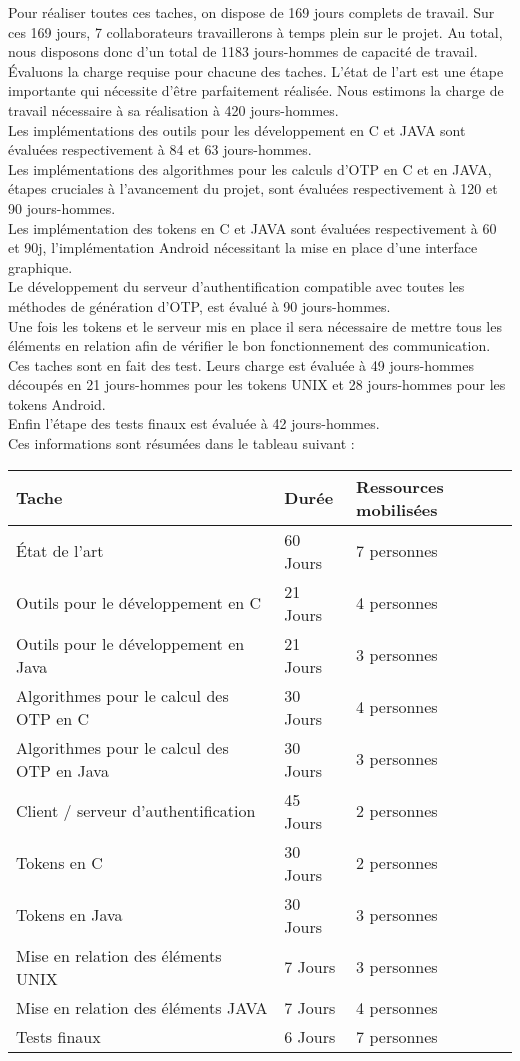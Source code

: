 \documentclass{../../res/univ-projet}
\begin{document}
	Pour réaliser toutes ces taches, on dispose de 169 jours complets de travail. Sur ces 169 jours, 7 collaborateurs travaillerons à temps plein sur le projet.
	Au total, nous disposons donc d'un total de 1183 jours-hommes de capacité de travail.
	Évaluons la charge requise pour chacune des taches.
	L'état de l'art est une étape importante qui nécessite d'être parfaitement réalisée. Nous estimons la charge de travail nécessaire à sa réalisation à 420 jours-hommes. \\
	Les implémentations des outils pour les développement en C et JAVA sont évaluées respectivement à 84 et 63 jours-hommes. \\
	Les implémentations des algorithmes pour les calculs d'OTP en C et en JAVA, étapes cruciales à l'avancement du projet, sont évaluées respectivement à 120 et 90 jours-hommes. \\
	Les implémentation des tokens en C et JAVA sont évaluées respectivement à 60 et 90j, l'implémentation Android nécessitant la mise en place d'une interface graphique. \\
	Le développement du serveur d'authentification compatible avec toutes les méthodes de génération d'OTP, est évalué à 90 jours-hommes. \\
	Une fois les tokens et le serveur mis en place il sera nécessaire de mettre tous les éléments en relation afin de vérifier le bon fonctionnement des communication. Ces taches sont en fait des test. Leurs charge est évaluée à 49 jours-hommes découpés en 21 jours-hommes pour les tokens UNIX et 28 jours-hommes pour les tokens Android.\\
	Enfin l'étape des tests finaux est évaluée à 42 jours-hommes.\\
	Ces informations sont résumées dans le tableau suivant :
	\newline

	\begin{tabular}{|l|l|l|}
	 \hline
	Tache & Durée & Ressources mobilisées \\ \hline
	État de l'art & 60 Jours & 7 personnes \\
	Outils pour le développement en C & 21 Jours & 4 personnes \\
	Outils pour le développement en Java & 21 Jours & 3 personnes \\
	Algorithmes pour le calcul des OTP en C & 30 Jours & 4 personnes \\
	Algorithmes pour le calcul des OTP en Java & 30 Jours & 3 personnes \\
	Client / serveur d'authentification & 45 Jours & 2 personnes \\
	Tokens en C & 30 Jours & 2 personnes \\
	Tokens en Java & 30 Jours & 3 personnes \\
	Mise en relation des éléments UNIX & 7 Jours & 3 personnes \\
	Mise en relation des éléments JAVA & 7 Jours & 4 personnes \\
	Tests finaux & 6 Jours & 7 personnes \\ \hline
	\end{tabular}
\end{document}
